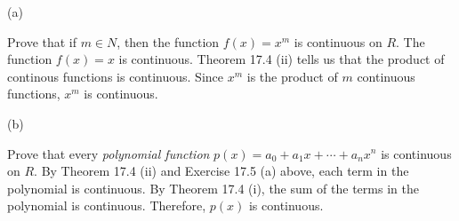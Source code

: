  (a)

Prove that if $m\in N$, then the function $f(x)=x^m$ is continuous
on $R$.
\medskip
The function $f(x)=x$ is continuous. Theorem 17.4 (ii) tells us that the product
of continous functions is continuous.
Since $x^m$ is the product of $m$ continuous functions, $x^m$ is continuous.


 (b)

Prove that every {\it polynomial function}
$p(x)=a_0+a_1x+\cdots+a_nx^n$ is continuous on $R$.
\medskip
By Theorem 17.4 (ii) and Exercise 17.5 (a) above, each term in the polynomial
is continuous.
By Theorem 17.4 (i), the sum of the terms in the polynomial is continuous.
Therefore, $p(x)$ is continuous.

